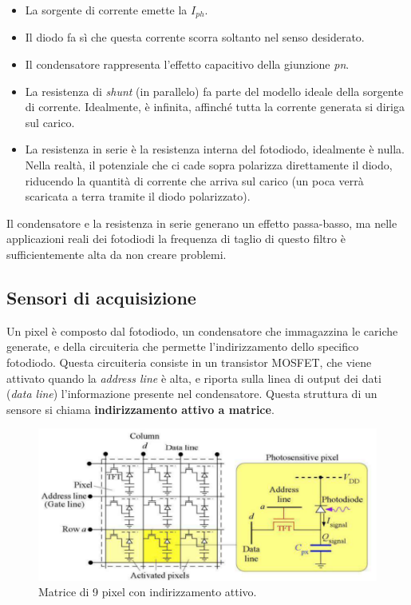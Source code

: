 \documentclass[a4paper,11pt]{article}
\begin{document}
\begin{itemize}
    \item La sorgente di corrente emette la $I_{ph}$.
    \item Il diodo fa sì che questa corrente scorra soltanto nel senso desiderato.
    \item Il condensatore rappresenta l'effetto capacitivo della giunzione \textit{pn}.
    \item La resistenza di \textit{shunt} (in parallelo) fa parte del modello ideale della sorgente di corrente.
    Idealmente, è infinita, affinché tutta la corrente generata si diriga sul carico.
    \item La resistenza in serie è la resistenza interna del fotodiodo, idealmente è nulla.
    Nella realtà, il potenziale che ci cade sopra polarizza direttamente il diodo, riducendo la quantità
    di corrente che arriva sul carico (un poca verrà scaricata a terra tramite il diodo polarizzato).
\end{itemize}
Il condensatore e la resistenza in serie generano un effetto passa-basso, ma nelle applicazioni reali dei fotodiodi
la frequenza di taglio di questo filtro è sufficientemente alta da non creare problemi.

\subsection{Sensori di acquisizione}
Un pixel è composto dal fotodiodo, un condensatore che immagazzina le cariche generate, e della circuiteria
che permette l'indirizzamento dello specifico fotodiodo. Questa circuiteria consiste in un transistor MOSFET, che viene
attivato quando la \textit{address line} è alta, e riporta sulla linea di output dei dati (\textit{data line}) l'informazione presente nel condensatore. Questa struttura di un sensore
si chiama \textbf{indirizzamento attivo a matrice}.

\renewcommand{\thefigure}{3.6}
\begin{figure}[!h]
  \centering
    \includegraphics[scale=0.5]{images/3/ama.png}
    \caption{Matrice di 9 pixel con indirizzamento attivo.}
\end{figure}
\end{document}
